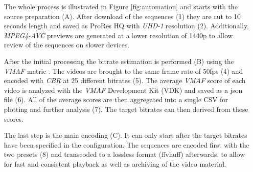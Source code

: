 The whole process is illustrated in Figure \ref{fig:automation} and starts with the source preparation (A). After download of the sequences (1) they are cut to 10 seconds length and saved as ProRes HQ with \textit{UHD-1} resolution (2). Additionally, \textit{MPEG4-AVC} previews are generated at a lower resolution of 1440p to allow review of the sequences on slower devices.

After the initial processing the bitrate estimation is performed (B) using the \textit{VMAF} metric \cite{lin2013:mmf}. The videos are brought to the same frame rate of 50fps (4) and encoded with \textit{CBR} at 25 different bitrates (5). The average \textit{VMAF} score of each video is analyzed with the \textit{VMAF} Development Kit (VDK) \cite{web:vdk} and saved as a json file (6). All of the average scores are then aggregated into a single CSV for plotting and further analysis (7). The target bitrates can then derived from these scores.

The last step is the main encoding (C). It can only start after the target bitrates have been specified in the configuration. The sequences are encoded first with the two presets (8) and transcoded to a lossless format (ffvhuff) afterwards, to allow for fast and consistent playback as well as archiving of the video material.


